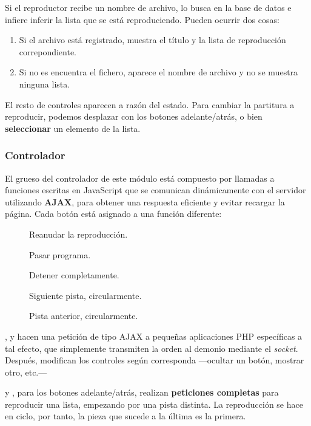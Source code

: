 \smallskip

Si el reproductor recibe un nombre de archivo, lo busca en la base de datos e infiere inferir la lista que se está reproduciendo. Pueden ocurrir dos cosas:

\begin{enumerate}
	\item Si el archivo está registrado, muestra el título y la lista de reproducción correpondiente.
	\item Si no es encuentra el fichero, aparece el nombre de archivo y no se muestra ninguna lista.
\end{enumerate}

El resto de controles aparecen a razón del estado. Para cambiar la partitura a reproducir, podemos desplazar con los botones adelante/atrás, o bien \textbf{seleccionar} un elemento de la lista.

\subsubsection{Controlador}

El grueso del controlador de este módulo está compuesto por llamadas a funciones escritas en JavaScript que se comunican dinámicamente con el servidor utilizando \textbf{\acrshort{AJAX}}, para obtener una respuesta eficiente y evitar recargar la página. Cada botón está asignado a una función diferente:

\begin{description}
	\item[] Reanudar la reproducción.
	\item[] Pasar programa.
	\item[] Detener completamente.
	\item[] Siguiente pista, circularmente.
	\item[] Pista anterior, circularmente.
\end{description}

,  y  hacen una petición de tipo \acrshort{AJAX} a pequeñas aplicaciones PHP específicas a tal efecto, que simplemente transmiten la orden al demonio mediante el \textit{socket}. Después, modifican los controles según corresponda ---ocultar un botón, mostrar otro, etc.---

 y , para los botones adelante/atrás, realizan \textbf{peticiones completas} para reproducir una lista, empezando por una pista distinta. La reproducción se hace en ciclo, por tanto, la pieza que sucede a la última es la primera.

